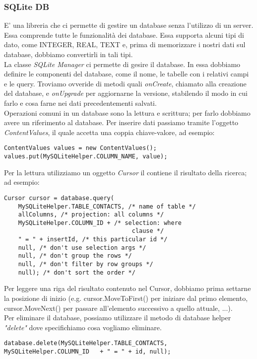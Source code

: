 \subsubsection{SQLite DB}
E' una libreria che ci permette di gestire un database senza l'utilizzo di un
server. Essa comprende tutte le funzionalità dei database. Essa supporta alcuni
tipi di dato, come INTEGER, REAL, TEXT e, prima di memorizzare i nostri dati sul
database, dobbiamo convertirli in tali tipi.\\
La classe \textit{SQLite Manager} ci permette di gesire il database. In essa
dobbiamo definire le componenti del database, come il nome, le tabelle con i
relativi campi e le query. Troviamo ovveride di metodi quali \textit{onCreate},
chiamato alla creazione del database, e \textit{onUpgrade} per aggiornarne la
versione, stabilendo il modo in cui farlo e cosa farne nei dati precedentementi
salvati.\\
Operazioni comuni in un database sono la lettura e scrittura; per farlo dobbiamo
avere un riferimento al database. Per inserire dati passiamo tramite l'oggetto
\textit{ContentValues}, il quale accetta una coppia chiave-valore, ad esempio:
\begin{lstlisting}[frame=single]
ContentValues values = new ContentValues();
values.put(MySQLiteHelper.COLUMN_NAME, value);
\end{lstlisting}
Per la lettura utilizziamo un oggetto \textit{Cursor} il contiene il risultato
della ricerca; ad esempio:
\begin{lstlisting}[frame=single]
Cursor cursor = database.query(
    MySQLiteHelper.TABLE_CONTACTS, /* name of table */
    allColumns, /* projection: all columns */
    MySQLiteHelper.COLUMN_ID + /* selection: where
                                    clause */
    " = " + insertId, /* this particular id */
    null, /* don't use selection args */
    null, /* don't group the rows */
    null, /* don't filter by row groups */
    null); /* don't sort the order */
\end{lstlisting}
Per leggere una riga del risultato contenuto nel Cursor, dobbiamo prima settarne
la posizione di inizio (e.g. cursor.MoveToFirst() per iniziare dal primo
elemento, cursor.MoveNext() per passare all'elemento successivo a quello
attuale, ...).\\
Per eliminare il database, possiamo utilizzare il metodo di database helper
\textit{"delete"} dove specifichiamo cosa vogliamo eliminare.
\begin{lstlisting}[frame=single]
database.delete(MySQLiteHelper.TABLE_CONTACTS,
MySQLiteHelper.COLUMN_ID   + " = " + id, null);
\end{lstlisting}

